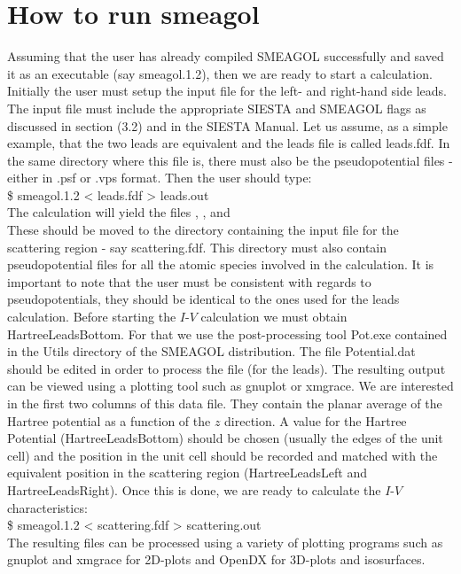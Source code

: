 \documentclass[11pt]{article}
\begin{document}
{\section{How to run smeagol}

Assuming that the user has already compiled SMEAGOL successfully and saved it as an executable (say smeagol.1.2), then we are ready to start a calculation. Initially the user must setup the input file for the left- and right-hand side leads. The input file must include the appropriate SIESTA and SMEAGOL flags as discussed in section (3.2) and in the SIESTA Manual. Let us assume, as a simple example, that the two leads are equivalent and the leads file is called leads.fdf. In the same directory where this file is, there must also be the pseudopotential files - either in .psf or .vps format. Then the user should type:\\
{\ttfamily \$ smeagol.1.2 < leads.fdf > leads.out}\\
The calculation will yield the files , ,  and\\  These should be moved to the directory containing the input file for the scattering region - say scattering.fdf. This directory must also contain pseudopotential files for all the atomic species involved in the calculation. It is important to note that the user must be consistent with regards to pseudopotentials, they should be identical to the ones used for the leads calculation.  Before starting the $I$-$V$ calculation we must obtain HartreeLeadsBottom. For that we use the post-processing tool Pot.exe contained in the Utils directory of the SMEAGOL distribution.  The file Potential.dat should be edited in order to process the file  (for the leads). The resulting output  can be viewed using a plotting tool such as gnuplot or xmgrace.  We are interested in the first two columns of this data file. They contain the planar average of the Hartree potential as a function of the $z$ direction. A value for the Hartree Potential (HartreeLeadsBottom) should be chosen (usually the edges of the unit cell) and the position in the unit cell should be recorded and matched with the equivalent position in the scattering region (HartreeLeadsLeft and HartreeLeadsRight). Once this is done, we are ready to calculate the $I$-$V$ characteristics:\\
{\ttfamily \$ smeagol.1.2 < scattering.fdf > scattering.out}\\
The resulting files can be processed using a variety of plotting programs such as gnuplot and xmgrace for 2D-plots and OpenDX for 3D-plots and isosurfaces.




}
\end{document}
